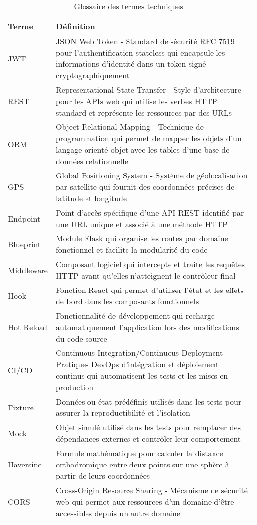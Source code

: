 \begin{table}[h]
\centering
\small
\begin{tabularx}{\textwidth}{|p{3cm}|X|}
\hline
\textbf{Terme} & \textbf{Définition} \\
\hline
JWT & JSON Web Token - Standard de sécurité RFC 7519 pour l'authentification stateless qui encapsule les informations d'identité dans un token signé cryptographiquement \\
\hline
REST & Representational State Transfer - Style d'architecture pour les APIs web qui utilise les verbes HTTP standard et représente les ressources par des URLs \\
\hline
ORM & Object-Relational Mapping - Technique de programmation qui permet de mapper les objets d'un langage orienté objet avec les tables d'une base de données relationnelle \\
\hline
GPS & Global Positioning System - Système de géolocalisation par satellite qui fournit des coordonnées précises de latitude et longitude \\
\hline
Endpoint & Point d'accès spécifique d'une API REST identifié par une URL unique et associé à une méthode HTTP \\
\hline
Blueprint & Module Flask qui organise les routes par domaine fonctionnel et facilite la modularité du code \\
\hline
Middleware & Composant logiciel qui intercepte et traite les requêtes HTTP avant qu'elles n'atteignent le contrôleur final \\
\hline
Hook & Fonction React qui permet d'utiliser l'état et les effets de bord dans les composants fonctionnels \\
\hline
Hot Reload & Fonctionnalité de développement qui recharge automatiquement l'application lors des modifications du code source \\
\hline
CI/CD & Continuous Integration/Continuous Deployment - Pratiques DevOps d'intégration et déploiement continus qui automatisent les tests et les mises en production \\
\hline
Fixture & Données ou état prédéfinis utilisés dans les tests pour assurer la reproductibilité et l'isolation \\
\hline
Mock & Objet simulé utilisé dans les tests pour remplacer des dépendances externes et contrôler leur comportement \\
\hline
Haversine & Formule mathématique pour calculer la distance orthodromique entre deux points sur une sphère à partir de leurs coordonnées \\
\hline
CORS & Cross-Origin Resource Sharing - Mécanisme de sécurité web qui permet aux ressources d'un domaine d'être accessibles depuis un autre domaine \\
\hline
\end{tabularx}
\caption{Glossaire des termes techniques}
\end{table}

